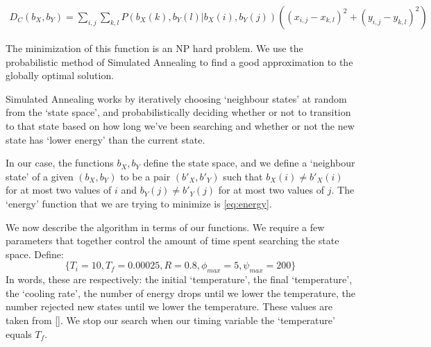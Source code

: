 \begin{align}
    \label{eq:energy}
    D_C(b_X,b_Y)=
        \sum_{i,j}
            \sum_{k,l}
            P(b_X(k), b_Y(l) | b_X(i), b_Y(j))
            \left((x_{i,j}-x_{k,l})^2+(y_{i,j}-y_{k,l})^2\right)
\end{align}

The minimization of this function is an NP hard problem. We use the probabilistic method of Simulated Annealing to find a good approximation to the globally optimal solution.

Simulated Annealing works by iteratively choosing `neighbour states' at random from the `state space', and probabilistically deciding whether or not to transition to that state based on how long we've been searching and whether or not the new state has `lower energy' than the current state.

In our case, the functions $b_X,b_Y$ define the state space, and we define a `neighbour state' of a given $(b_X, b_Y)$ to be a pair $(b'_X, b'_Y)$ such that $b_X(i)\neq b'_X(i)$ for at most two values of $i$ and $b_Y(j)\neq b'_Y(j)$ for at most two values of $j$. The `energy' function that we are trying to minimize is \eqref{eq:energy}.

We now describe the algorithm in terms of our functions. We require a few parameters that together control the amount of time spent searching the state space. Define:
\begin{equation}
    \{T_i=10,T_f=0.00025,R=0.8,\phi_{max}=5,\psi_{max}=200\}
\end{equation}
In words, these are respectively: the initial `temperature', the final `temperature', the `cooling rate', the number of energy drops until we lower the temperature, the number rejected new states until we lower the temperature. These values are taken from \ref{}. We stop our search when our timing variable the `temperature' equals $T_f$.

